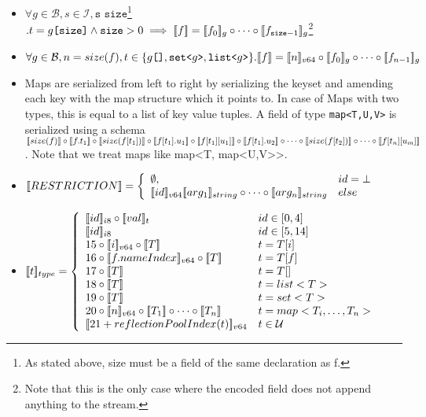 \begin{itemize}
 \item $\forall g \in \mathcal{B}, s \in \mathcal{I}, \texttt{s size}$\footnote{As stated above, size must be a field of the same declaration as f.} $. t = g\texttt{[size]} \wedge \texttt{size} > 0 \implies [\![f]\!] = [\![f_0]\!]_g \circ \cdots \circ [\![f_{\texttt{size}-1}]\!]_g$\footnote{Note that this is the only case where the encoded field does not append anything to the stream.}
 
 \item $\forall g \in \mathcal{B}, n = size(f), t \in \{g\texttt{[]}, \texttt{set<}g\texttt{>}, \texttt{list<}g\texttt{>}\}. \den{f} = \den{n}_{v64} \circ \den{f_0}_g \circ \cdots \circ \den{f_{n-1}}_g$
 
 \item Maps are serialized from left to right by serializing the keyset and amending each key with the map structure which it points to. In case of Maps with two types, this is equal to a list of key value tuples.
 A field of type \verb/map<T,U,V>/ is serialized using a schema $ \den{size(f)} \circ \den{f.t_1} \circ \den{size(f[t_1])} \circ \den{f[t_1].u_1} \circ \den{f[t_1][u_1]} \circ \den{f[t_1].u_2} \circ \cdots \circ \den{size(f[t_2])} \circ \cdots \circ \den{f[t_n][u_m]}$. Note that we treat maps like map<T, map<U,V>>.
 
 \item $\den{RESTRICTION} = \left\{ 
   \begin{array}{l l}
     \emptyset, & id = \bot\\
     \den{id}_{v64}\den{arg_1}_{string}\circ \cdots \circ \den{arg_n}_{string} & else
   \end{array} \right.$
 
 \item $\den{t}_{type} = \left\{ 
   \begin{array}{l l}
   \den{id}_{i8} \circ \den{val}_{t} & id \in [0,4] \\
   \den{id}_{i8} & id \in [5,14] \\
   15 \circ \den{i}_{v64} \circ \den{T} & t = T[i]\\
   16 \circ \den{f.nameIndex}_{v64} \circ \den{T} & t = T[f]\\
   17 \circ \den{T} & t = T[]\\
   18 \circ \den{T} & t = list<T>\\
   19 \circ \den{T} & t = set<T>\\
   20\circ \den{n}_{v64} \circ \den{T_1} \circ \cdots \circ \den{T_n} & t = map<T_i,\ldots,T_n>\\
   \den{21+reflectionPoolIndex(t)}_{v64} & t \in \mathcal{U}\\
   \end{array} \right.$
\end{itemize}

